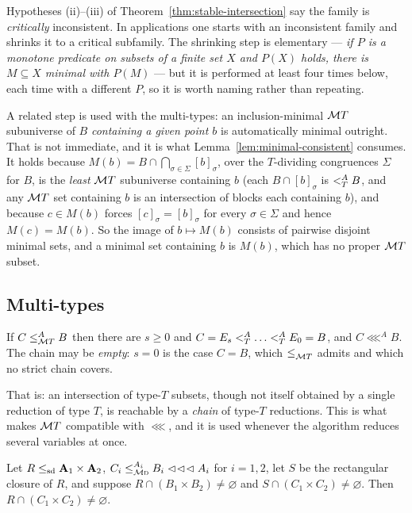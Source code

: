 \begin{hazard}\label{haz:minimality}
Hypotheses (ii)--(iii) of Theorem~\ref{thm:stable-intersection} say the family
is \emph{critically} inconsistent. In applications one starts with an
inconsistent family and shrinks it to a critical subfamily. The shrinking step
is elementary --- \emph{if $P$ is a monotone predicate on subsets of a finite
set $X$ and $P(X)$ holds, there is $M\subseteq X$ minimal with $P(M)$} --- but
it is performed at least four times below, each time with a different $P$, so
it is worth naming rather than repeating.

A related step is used with the multi-types: an inclusion-minimal
$\MT T$ subuniverse of $B$ \emph{containing a given point $b$} is
automatically minimal outright. That is not immediate, and it is what
Lemma~\ref{lem:minimal-consistent} consumes. It holds because
$M(b)=B\cap\bigcap_{\sigma\in\Sigma}[b]_{\sigma}$, over the $T$-dividing
congruences $\Sigma$ for $B$, is the \emph{least} $\MT T$ subuniverse
containing $b$ (each $B\cap[b]_{\sigma}$ is $\subt[A]{T}B$, and any $\MT T$ set
containing $b$ is an intersection of blocks each containing $b$), and because
$c\in M(b)$ forces $[c]_{\sigma}=[b]_{\sigma}$ for every $\sigma\in\Sigma$ and
hence $M(c)=M(b)$. So the image of $b\mapsto M(b)$ consists of pairwise
disjoint minimal sets, and a minimal set containing $b$ is $M(b)$, which has no
proper $\MT T$ subset.
\end{hazard}

\subsection{Multi-types}

\begin{lemma}\label{lem:multitype-chain}
If $C\subte[A]{\MT T}B$ then there are $s\ge 0$ and
$C=E_{s}\subt[A]{T}\dots\subt[A]{T}E_{0}=B$, and $C\lll^{A}B$. The chain may
be \emph{empty}: $s=0$ is the case $C=B$, which $\subte{\MT T}$ admits and
which no strict chain covers.
\end{lemma}

That is: an intersection of type-$T$ subsets, though not itself obtained by a
single reduction of type $T$, is reachable by a \emph{chain} of type-$T$
reductions. This is what makes $\MT T$ compatible with $\lll$, and it is used
whenever the algorithm reduces several variables at once.

\begin{lemma}\label{lem:preserve-linked}
Let $R\sdle\mathbf A_{1}\times\mathbf A_{2}$,
$C_{i}\subte[A_{i}]{\TMD}B_{i}\lll A_{i}$ for $i=1,2$, let $S$ be the
rectangular closure of $R$, and suppose $R\cap(B_{1}\times B_{2})\neq
\varnothing$ and $S\cap(C_{1}\times C_{2})\neq\varnothing$. Then
$R\cap(C_{1}\times C_{2})\neq\varnothing$.
\end{lemma}

